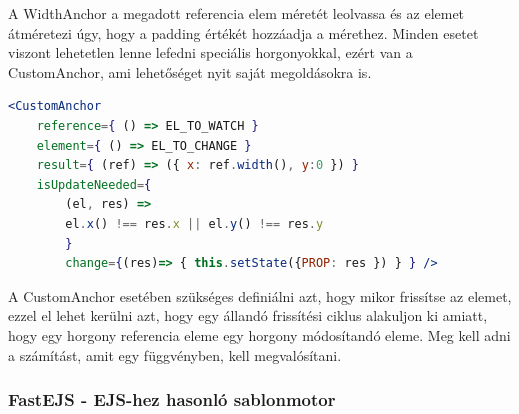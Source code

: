 \documentclass[a4paper,12pt,oneside]{report}
\begin{document}
\begin{justify}
	A WidthAnchor a megadott referencia elem méretét leolvassa és az elemet átméretezi úgy, hogy a padding értékét hozzáadja a mérethez. Minden esetet viszont lehetetlen lenne lefedni speciális horgonyokkal, ezért van a CustomAnchor, ami lehetőséget nyit saját megoldásokra is.

	\begin{lstlisting}[language=jsx]
	<CustomAnchor 
	reference={ () => EL_TO_WATCH }
	element={ () => EL_TO_CHANGE }
	result={ (ref) => ({ x: ref.width(), y:0 }) }
	isUpdateNeeded={
		(el, res) => 
		el.x() !== res.x || el.y() !== res.y 
		}
		change={(res)=> { this.setState({PROP: res }) } } />
	\end{lstlisting}

	A CustomAnchor esetében szükséges definiálni azt, hogy mikor frissítse az elemet, ezzel el lehet kerülni azt, hogy egy állandó frissítési ciklus alakuljon ki amiatt, hogy egy horgony referencia eleme egy horgony módosítandó eleme. Meg kell adni a számítást, amit egy függvényben, kell megvalósítani.

\end{justify}

\newpage
\subsubsection{FastEJS - EJS-hez hasonló sablonmotor}
\end{document}

